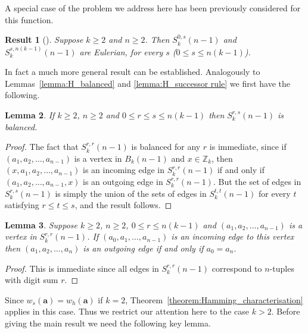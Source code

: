\documentclass[a4paper,11pt]{article}
\theoremstyle{plain}
\newtheorem{lemma}{Lemma}[section]
\newtheorem{result}[lemma]{Result}
\theoremstyle{definition}
\theoremstyle{remark}
\begin{document}
A special case of the problem we address here has been previously considered for this
function.

\begin{result}[\cite{Gabric20}]  \label{result:old_S_lemma}
Suppose $k\geq2$ and $n\geq 2$. Then $S_k^{0,s}(n-1)$ and $S_k^{s,n(k-1)}(n-1)$ are Eulerian,
for every $s$ ($0\leq s\leq n(k-1)$).
\end{result}

In fact a much more general result can be established.  Analogously to
Lemmas~\ref{lemma:H_balanced} and \ref{lemma:H_successor rule} we first have the following.

\begin{lemma}  \label{lemma:S_balanced}
If $k\geq2$, $n\geq 2$ and $0\leq r\leq s\leq n(k-1)$ then $S_k^{r,s}(n-1)$ is balanced.
\end{lemma}

\begin{proof}
The fact that $S_k^{r,r}(n-1)$ is balanced for any $r$ is immediate, since if
$(a_1,a_2,\dots,a_{n-1})$ is a vertex in $B_k(n-1)$ and $x\in \mathbb{Z}_k$, then
$(x,a_1,a_2,\dots,a_{n-1})$ is an incoming edge in $S_k^{r,r}(n-1)$ if and only if
$(a_1,a_2,\dots,a_{n-1},x)$ is an outgoing edge in $S_k^{r,r}(n-1)$.  But the set of edges in
$S_k^{r,s}(n-1)$ is simply the union of the sets of edges in $S_k^{t,t}(n-1)$ for every $t$
satisfying $r\leq t\leq s$, and the result follows.
\end{proof}

\begin{lemma}  \label{lemma:S_successor rule}
Suppose $k\geq2$, $n\geq 2$, $0\leq r\leq n(k-1)$ and $(a_1,a_2,\dots,a_{n-1})$ is a vertex in
$S_k^{r,r}(n-1)$. If $(a_0,a_1,\dots,a_{n-1})$ is an incoming edge to this vertex then
$(a_1,a_2,\dots,a_{n})$ is an outgoing edge if and only if $a_0=a_n$.
\end{lemma}

\begin{proof}
This is immediate since all edges in $S_k^{r,r}(n-1)$ correspond to $n$-tuples with digit sum $r$.
\end{proof}

Since $w_s(\mathbf{a})=w_h(\mathbf{a})$ if $k=2$, Theorem~\ref{theorem:Hamming_characterisation}
applies in this case.  Thus we restrict our attention here to the case $k>2$.  Before giving the
main result we need the following key lemma.
\end{document}

